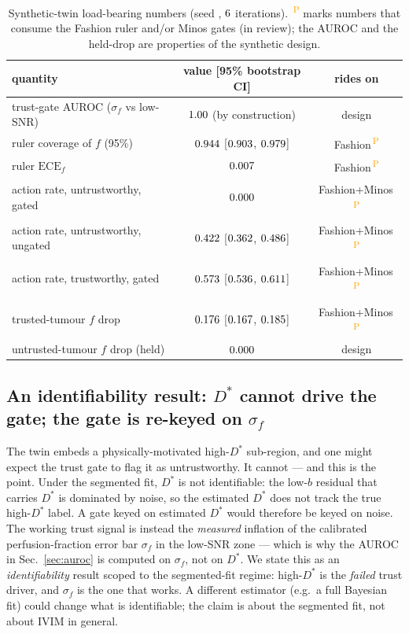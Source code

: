 \documentclass[12pt]{iopart}
\newcommand{\PROV}{\textsuperscript{\textcolor{orange}{\,P}}}
\newcommand{\Dstar}{D^{*}}
\newcommand{\sigf}{\sigma_{f}}
\newcommand{\fq}{f}          %
\begin{document}
\begin{table}[t]\centering\small
\begin{tabular}{lcc}
\toprule
quantity & value [95\% bootstrap CI] & rides on \\
\midrule
trust-gate AUROC ($\sigf$ vs low-SNR) & $1.00$ (by construction) & design \\
ruler coverage of $\fq$ (95\%) & $0.944$ [$0.903$, $0.979$] & Fashion\PROV \\
ruler $\mathrm{ECE}_f$ & $0.007$ & Fashion\PROV \\
action rate, untrustworthy, gated & $0.000$ & Fashion+Minos\PROV \\
action rate, untrustworthy, ungated & $0.422$ [$0.362$, $0.486$] & Fashion+Minos\PROV \\
action rate, trustworthy, gated & $0.573$ [$0.536$, $0.611$] & Fashion+Minos\PROV \\
trusted-tumour $\fq$ drop & $0.176$ [$0.167$, $0.185$] & Fashion+Minos\PROV \\
untrusted-tumour $\fq$ drop (held) & $0.000$ & design \\
\bottomrule
\end{tabular}
\caption{Synthetic-twin load-bearing numbers (seed \numSeed, $6$ iterations).
\PROV{} marks numbers that consume the Fashion ruler and/or Minos gates (in review); the
AUROC and the held-drop are properties of the synthetic design.}
\label{tab:syn}
\end{table}

\subsection{An identifiability result: $\Dstar$ cannot drive the gate; the gate is
re-keyed on $\sigf$}\label{sec:rekey}
The twin embeds a physically-motivated high-$\Dstar$ sub-region, and one might expect the
trust gate to flag it as untrustworthy. It cannot --- and this is the point. Under the
segmented fit, $\Dstar$ is not identifiable: the low-$b$ residual that carries $\Dstar$ is
dominated by noise, so the estimated $\Dstar$ does not track the true high-$\Dstar$ label.
A gate keyed on estimated $\Dstar$ would therefore be keyed on noise. The working trust
signal is instead the \emph{measured} inflation of the calibrated perfusion-fraction error
bar $\sigf$ in the low-SNR zone --- which is why the AUROC in Sec.~\ref{sec:auroc} is
computed on $\sigf$, not on $\Dstar$. We state this as an \emph{identifiability} result
scoped to the segmented-fit regime: high-$\Dstar$ is the \emph{failed} trust driver, and
$\sigf$ is the one that works. A different estimator (e.g.\ a full Bayesian fit) could
change what is identifiable; the claim is about the segmented fit, not about IVIM in
general.
\end{document}
